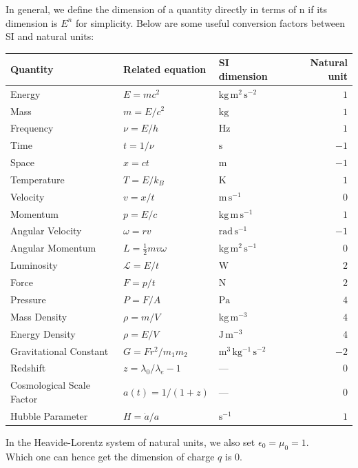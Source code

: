 In general, we define the dimension of a quantity directly in terms of n if its dimension is $E^n$ for simplicity.
Below are some useful conversion factors between SI and natural units:
\begin{center}
\begin{tabular}{@{}lll@{\quad}r@{}}
	\toprule
	\textbf{Quantity} & \textbf{Related equation} & \textbf{SI dimension} & \textbf{Natural unit} \\
\midrule
Energy & $E = mc^2$ & $\mathrm{kg\,m^2\,s^{-2}}$ & $1$ \\
Mass & $m = E/c^2$ & $\mathrm{kg}$ & $1$ \\
Frequency & $\nu = E/h$ & $\mathrm{Hz}$ & $1$ \\
Time & $t = 1/\nu$ & $\mathrm{s}$ & $-1$ \\
Space & $x = ct$ & $\mathrm{m}$ & $-1$ \\
Temperature & $T = E/k_B$ & $\mathrm{K}$ & $1$ \\
\midrule
Velocity & $v = x/t$ & $\mathrm{m\,s^{-1}}$ & $0$ \\
Momentum & $p = E/c$ & $\mathrm{kg\,m\,s^{-1}}$ & $1$ \\
Angular Velocity & $\omega = rv$ & $\mathrm{rad\,s^{-1}}$ & $-1$ \\
Angular Momentum & $L = \frac{1}{2}mv \omega$ & $\mathrm{kg\,m^2\,s^{-1}}$ & $0$ \\
Luminosity & $\mathcal{L} = E/t$ & $\mathrm{W}$ & $2$ \\
Force & $F = p/t$ & $\mathrm{N}$ & $2$ \\
Pressure & $P = F/A$ & $\mathrm{Pa}$ & $4$ \\
Mass Density & $\rho = m/V$ & $\mathrm{kg\,m^{-3}}$ & $4$ \\
Energy Density & $\rho = E/V$ & $\mathrm{J\,m^{-3}}$ & $4$ \\
\midrule
Gravitational Constant & $G = Fr^2/m_1m_2$ & $\mathrm{m^3\,kg^{-1}\,s^{-2}}$ & $-2$ \\
Redshift & $z = \lambda_0/\lambda_e - 1$ & --- & $0$ \\
Cosmological Scale Factor & $a(t) = 1/(1+z)$ & --- & $0$ \\
Hubble Parameter & $H = \dot{a}/a$ & $\mathrm{s^{-1}}$ & $1$ \\
\bottomrule
\end{tabular}
\end{center}

\bigskip\noindent
\bigskip\noindent
\begin{remark}
  In the Heavide-Lorentz system of natural units, we also set $\epsilon_0 = \mu_0 = 1$.\\
  Which one can hence get the dimension of charge $q$ is 0.
\end{remark} 



